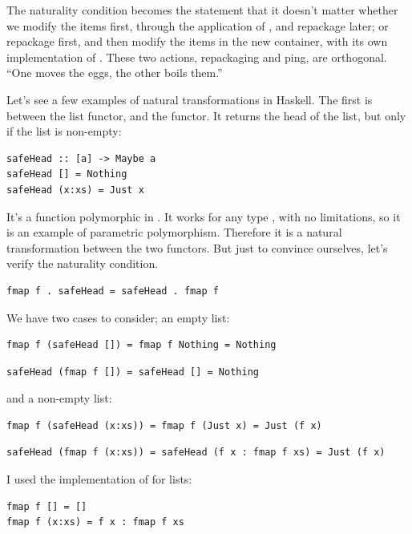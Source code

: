 The naturality condition becomes the statement that it doesn't matter
whether we modify the items first, through the application of
, and repackage later; or repackage first, and then modify
the items in the new container, with its own implementation of
. These two actions, repackaging and ping, are
orthogonal. ``One moves the eggs, the other boils them.''

Let's see a few examples of natural transformations in Haskell. The
first is between the list functor, and the  functor. It
returns the head of the list, but only if the list is non-empty:

\begin{verbatim}
safeHead :: [a] -> Maybe a
safeHead [] = Nothing
safeHead (x:xs) = Just x
\end{verbatim}

It's a function polymorphic in . It works for any type
, with no limitations, so it is an example of parametric
polymorphism. Therefore it is a natural transformation between the two
functors. But just to convince ourselves, let's verify the naturality
condition.

\begin{verbatim}
fmap f . safeHead = safeHead . fmap f
\end{verbatim}

We have two cases to consider; an empty list:

\begin{verbatim}
fmap f (safeHead []) = fmap f Nothing = Nothing
\end{verbatim}

\begin{verbatim}
safeHead (fmap f []) = safeHead [] = Nothing
\end{verbatim}

and a non-empty list:

\begin{verbatim}
fmap f (safeHead (x:xs)) = fmap f (Just x) = Just (f x)
\end{verbatim}

\begin{verbatim}
safeHead (fmap f (x:xs)) = safeHead (f x : fmap f xs) = Just (f x)
\end{verbatim}

I used the implementation of  for lists:

\begin{verbatim}
fmap f [] = []
fmap f (x:xs) = f x : fmap f xs
\end{verbatim}

